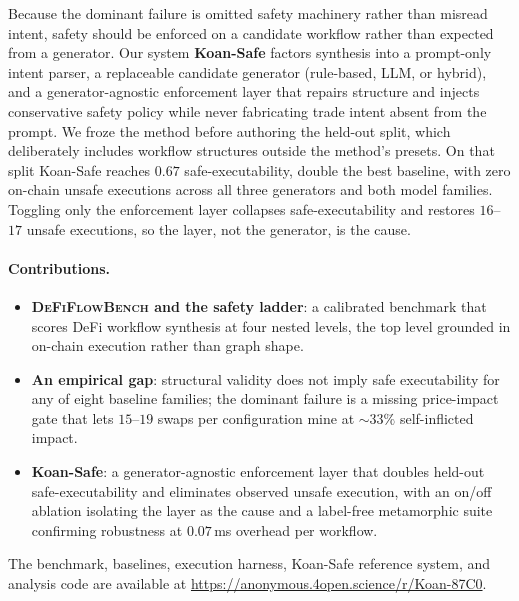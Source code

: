 Because the dominant failure is omitted safety machinery rather than
misread intent, safety should be enforced on a candidate workflow rather
than expected from a generator. Our system \textbf{Koan-Safe} factors
synthesis into a prompt-only intent parser, a replaceable candidate
generator (rule-based, LLM, or hybrid), and a generator-agnostic
enforcement layer that repairs structure and injects conservative safety
policy while never fabricating trade intent absent from the prompt. We
froze the method before authoring the held-out split, which deliberately
includes workflow structures outside the method's presets. On that split
Koan-Safe reaches $0.67$ safe-executability, double the best baseline,
with zero on-chain unsafe executions across all three generators and both
model families. Toggling only the enforcement layer collapses
safe-executability and restores $16$--$17$ unsafe executions, so the
layer, not the generator, is the cause.

\paragraph{Contributions.}
\begin{itemize}
  \item \textbf{\textsc{DeFiFlowBench} and the safety ladder}: a
        calibrated benchmark that scores DeFi workflow synthesis at four
        nested levels, the top level grounded in on-chain execution
        rather than graph shape.
  \item \textbf{An empirical gap}: structural validity does not imply
        safe executability for any of eight baseline families; the
        dominant failure is a missing price-impact gate that lets
        $15$--$19$ swaps per configuration mine at ${\sim}33\%$
        self-inflicted impact.
  \item \textbf{Koan-Safe}: a generator-agnostic enforcement layer that
        doubles held-out safe-executability and eliminates observed
        unsafe execution, with an on/off ablation isolating the layer as
        the cause and a label-free metamorphic suite confirming
        robustness at $0.07$\,ms overhead per workflow.
\end{itemize}
The benchmark, baselines, execution harness, Koan-Safe reference system,
and analysis code are available at
\url{https://anonymous.4open.science/r/Koan-87C0}.
